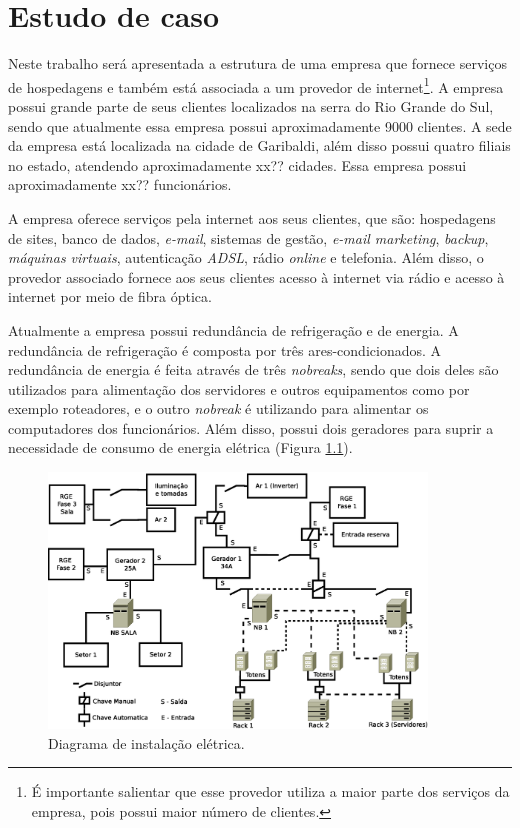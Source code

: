 \chapter{Estudo de caso}
\label{cap:estudodecaso}

Neste trabalho será apresentada a estrutura de uma empresa que fornece serviços de hospedagens e também está associada a um provedor de 
internet\footnote{É importante salientar que esse provedor utiliza a maior parte dos serviços da empresa, pois possui maior número de clientes.}. 
A empresa possui grande parte de seus clientes localizados na serra do Rio Grande do Sul, sendo que atualmente essa empresa possui 
aproximadamente 9000 clientes. A sede da empresa está localizada na cidade de Garibaldi, além disso possui quatro filiais no estado, 
atendendo aproximadamente xx?? cidades. Essa empresa possui aproximadamente xx?? funcionários.

A empresa oferece serviços pela internet aos seus clientes, que são: hospedagens de sites, banco de dados, \textit{e-mail}, sistemas de gestão, 
\textit{e-mail marketing}, \textit{backup}, \textit{máquinas virtuais}, autenticação \textit{ADSL}, rádio \textit{online} e telefonia.
Além disso, o provedor associado fornece aos seus clientes acesso à internet via rádio e acesso à internet por meio de fibra óptica.

Atualmente a empresa possui redundância de refrigeração e de energia. A redundância de refrigeração é composta por três ares-condicionados. 
A redundância de energia é feita através de três \textit{nobreaks}, sendo que dois deles são utilizados para alimentação dos servidores e outros 
equipamentos como por exemplo roteadores, e o outro \textit{nobreak} é utilizando para alimentar os computadores dos funcionários. Além disso, 
possui dois geradores para suprir a necessidade de consumo de energia elétrica (Figura \ref{fig:insteletrica}).

\begin{figure}[h!]
 \centering
 \includegraphics[width=380px]{img/insteletrica.eps}
 \caption{Diagrama de instalação elétrica.}
 \label{fig:insteletrica}
\end{figure}

